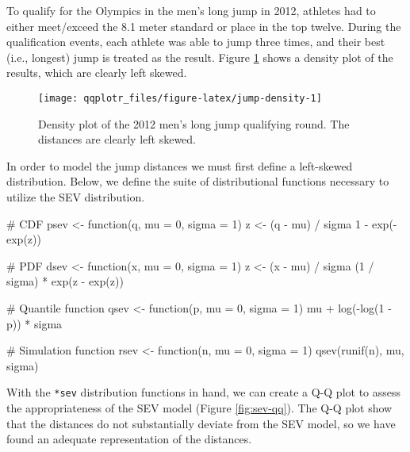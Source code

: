 To qualify for the Olympics in the men's long jump in 2012, athletes had
to either meet/exceed the 8.1 meter standard or place in the top twelve.
During the qualification events, each athlete was able to jump three
times, and their best (i.e., longest) jump is treated as the result.
Figure \ref{fig:jump-density} shows a density plot of the results, which
are clearly left skewed.

\begin{Schunk}
\begin{figure}

{\centering \texttt{[image: qqplotr\_files/figure-latex/jump-density-1]} 

}

\caption[Density plot of the 2012 men's long jump qualifying round]{Density plot of the 2012 men's long jump qualifying round. The distances are clearly left skewed.}\label{fig:jump-density}
\end{figure}
\end{Schunk}

In order to model the jump distances we must first define a left-skewed
distribution. Below, we define the suite of distributional functions
necessary to utilize the SEV distribution.

\begin{Schunk}
\begin{Sinput}
# CDF
psev <- function(q, mu = 0, sigma = 1) {
    z <- (q - mu) / sigma
    1 - exp(-exp(z))
}

# PDF
dsev <- function(x, mu = 0, sigma = 1) {
  z <- (x - mu) / sigma
  (1 / sigma) * exp(z - exp(z))
}

# Quantile function
qsev <- function(p, mu = 0, sigma = 1) {
  mu + log(-log(1 - p)) * sigma
}

# Simulation function
rsev <- function(n, mu = 0, sigma = 1) {
  qsev(runif(n), mu, sigma)
}
\end{Sinput}
\end{Schunk}

With the \texttt{*sev} distribution functions in hand, we can create a
Q-Q plot to assess the appropriateness of the SEV model (Figure
\ref{fig:sev-qq}). The Q-Q plot show that the distances do not
substantially deviate from the SEV model, so we have found an adequate
representation of the distances.

